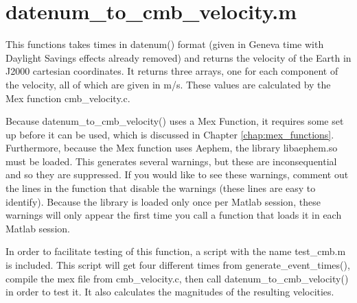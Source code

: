 \documentclass[12pt]{report}
\begin{document}
\section{datenum\_to\_cmb\_velocity.m}
This functions takes times in datenum() format (given in Geneva time with Daylight Savings effects already removed) and returns the velocity of the Earth in J2000 cartesian coordinates.  It returns three arrays, one for each component of the velocity, all of which are given in m/s.  These values are calculated by the Mex function cmb\_velocity.c.  

Because datenum\_to\_cmb\_velocity() uses a Mex Function, it requires some set up before it can be used, which is discussed in Chapter \ref{chap:mex_functions}.  Furthermore, because the Mex function uses Aephem, the library libaephem.so must be loaded.  This generates several warnings, but these are inconsequential and so they are suppressed.  If you would like to see these warnings, comment out the lines in the function that disable the warnings (these lines are easy to identify).  Because the library is loaded only once per Matlab session, these warnings will only appear the first time you call a function that loads it in each Matlab session.

In order to facilitate testing of this function, a script with the name test\_cmb.m is included.  This script will get four different times from generate\_event\_times(), compile the mex file from cmb\_velocity.c, then call datenum\_to\_cmb\_velocity() in order to test it.  It also calculates the magnitudes of the resulting velocities.
\end{document}
